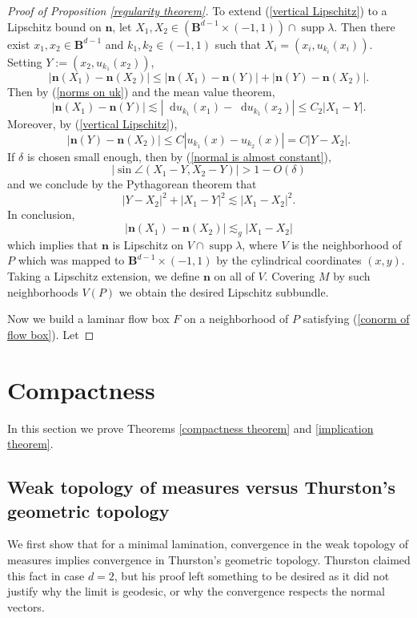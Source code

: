 \documentclass[reqno,11pt]{amsart}
\newcommand{\Ball}{\mathbf{B}}
\newcommand*\dif{\mathop{}\!\mathrm{d}}
\DeclareMathOperator{\supp}{supp}
\newcommand{\normal}{\mathbf n}
\theoremstyle{definition}
\numberwithin{equation}{section}
\begin{document}
\begin{proof}[Proof of Proposition \ref{regularity theorem}]
To extend (\ref{vertical Lipschitz}) to a Lipschitz bound on $\normal$, let $X_1, X_2 \in (\Ball^{d - 1} \times (-1, 1)) \cap \supp \lambda$.
Then there exist $x_1, x_2 \in \Ball^{d - 1}$ and $k_1, k_2 \in (-1, 1)$ such that $X_i = (x_i, u_{k_i}(x_i))$.
Setting $Y := (x_2, u_{k_1}(x_2))$,
$$|\normal(X_1) - \normal(X_2)| \leq |\normal(X_1) - \normal(Y)| + |\normal(Y) - \normal(X_2)|.$$
Then by (\ref{norms on uk}) and the mean value theorem,
$$|\normal(X_1) - \normal(Y)| \lesssim |\dif u_{k_1}(x_1) - \dif u_{k_1}(x_2)| \leq C_2 |X_1 - Y|.$$
Moreover, by (\ref{vertical Lipschitz}),
$$|\normal(Y) - \normal(X_2)| \leq C|u_{k_1}(x) - u_{k_2}(x)| = C|Y - X_2|.$$
If $\delta$ is chosen small enough, then by (\ref{normal is almost constant}),
$$|\sin \angle(X_1 - Y, X_2 - Y)| > 1 - O(\delta)$$
and we conclude by the Pythagorean theorem that
$$|Y - X_2|^2 + |X_1 - Y|^2 \lesssim |X_1 - X_2|^2.$$
In conclusion,
\begin{equation}\label{lipschitz normal}
|\normal(X_1) - \normal(X_2)| \lesssim_g |X_1 - X_2|
\end{equation}
which implies that $\normal$ is Lipschitz on $V \cap \supp \lambda$, where $V$ is the neighborhood of $P$ which was mapped to $\Ball^{d - 1} \times (-1, 1)$ by the cylindrical coordinates $(x, y)$.
Taking a Lipschitz extension, we define $\normal$ on all of $V$.
Covering $M$ by such neighborhoods $V(P)$ we obtain the desired Lipschitz subbundle.

Now we build a laminar flow box $F$ on a neighborhood of $P$ satisfying (\ref{conorm of flow box}).
Let
\end{proof}

\section{Compactness}\label{CompactnessSec}
In this section we prove Theorems \ref{compactness theorem} and \ref{implication theorem}.

\subsection{Weak topology of measures versus Thurston's geometric topology}
We first show that for a minimal lamination, convergence in the weak topology of measures implies convergence in Thurston's geometric topology.
Thurston claimed this fact \cite[Proposition 8.10.3]{thurston1979geometry} in case $d = 2$, but his proof left something to be desired as it did not justify why the limit is geodesic, or why the convergence respects the normal vectors.
\end{document}
